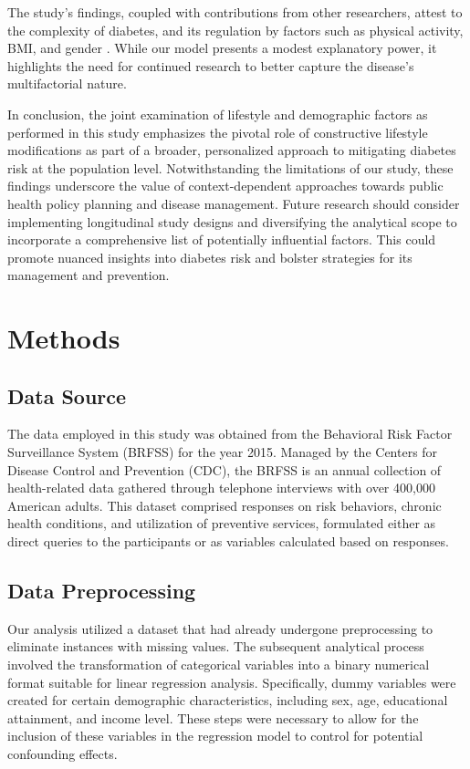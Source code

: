 \documentclass[11pt]{article}
\begin{document}
The study's findings, coupled with contributions from other researchers, attest to the complexity of diabetes, and its regulation by factors such as physical activity, BMI, and gender \cite{Seiglie2020DiabetesPA, Khanam2019PrevalenceAR, Hjerkind2017AdiposityPA}. While our model presents a modest explanatory power, it highlights the need for continued research to better capture the disease's multifactorial nature. 

In conclusion, the joint examination of lifestyle and demographic factors as performed in this study emphasizes the pivotal role of constructive lifestyle modifications as part of a broader, personalized approach to mitigating diabetes risk at the population level. Notwithstanding the limitations of our study, these findings underscore the value of context-dependent approaches towards public health policy planning and disease management. Future research should consider implementing longitudinal study designs and diversifying the analytical scope to incorporate a comprehensive list of potentially influential factors. This could promote nuanced insights into diabetes risk and bolster strategies for its management and prevention.

\section*{Methods}

\subsection*{Data Source}
The data employed in this study was obtained from the Behavioral Risk Factor Surveillance System (BRFSS) for the year 2015. Managed by the Centers for Disease Control and Prevention (CDC), the BRFSS is an annual collection of health-related data gathered through telephone interviews with over 400,000 American adults. This dataset comprised responses on risk behaviors, chronic health conditions, and utilization of preventive services, formulated either as direct queries to the participants or as variables calculated based on responses.

\subsection*{Data Preprocessing}
Our analysis utilized a dataset that had already undergone preprocessing to eliminate instances with missing values. The subsequent analytical process involved the transformation of categorical variables into a binary numerical format suitable for linear regression analysis. Specifically, dummy variables were created for certain demographic characteristics, including sex, age, educational attainment, and income level. These steps were necessary to allow for the inclusion of these variables in the regression model to control for potential confounding effects.
\end{document}
